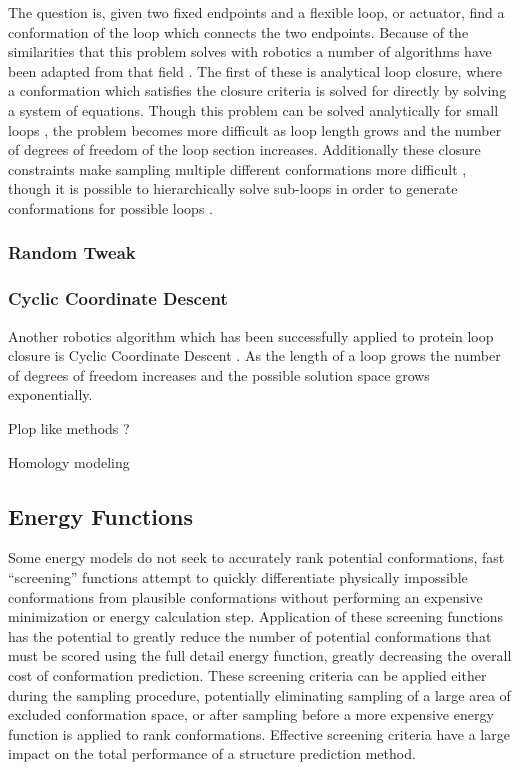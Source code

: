 The question is, given two fixed endpoints and a flexible loop, or actuator, find a conformation of the loop which connects the two endpoints.
Because of the similarities that this problem solves with robotics a number of algorithms have been adapted from that field \cite{kolodny2005inverse}.
The first of these is analytical loop closure, where a conformation which satisfies the closure criteria is solved for directly by solving a system of equations.
Though this problem can be solved analytically for small loops \cite{wedemeyer1999exact,go1970ring,bruccoleri1985chain,palmer1991standard}, the problem becomes more difficult as loop length grows and the number of degrees of freedom of the loop section increases.
Additionally these closure constraints make sampling multiple different conformations more difficult \cite{cortes2005sampling}, though it is possible to hierarchically solve sub-loops in order to generate conformations for possible loops \cite{wedemeyer1999exact}.

\subsubsection{Random Tweak}
\label{subsubsection:tweak}

\subsubsection{Cyclic Coordinate Descent}
\label{subsubsection:cyclic_coordinate_descent}
Another robotics algorithm which has been successfully applied to protein loop closure is Cyclic Coordinate Descent \cite{canutescu2003cyclic}.
As the length of a loop grows the number of degrees of freedom increases and the possible solution space grows exponentially. 


\cite{moult1986algorithm}



Plop like methods ? \cite{kolodny2005inverse}


Homology modeling \cite{browne1969possible}

\subsection{Energy Functions}
\label{subsection:energy_functions}
Some energy models do not seek to accurately rank potential conformations, fast ``screening'' functions attempt to quickly differentiate physically impossible conformations from plausible conformations without performing an expensive minimization or energy calculation step.
Application of these screening functions has the potential to greatly reduce the number of potential conformations that must be scored using the full detail energy function, greatly decreasing the overall cost of conformation prediction.
These screening criteria can be applied either during the sampling procedure, potentially eliminating sampling of a large area of excluded conformation space, or after sampling before a more expensive energy function is applied to rank conformations.
Effective screening criteria have a large impact on the total performance of a structure prediction method.

